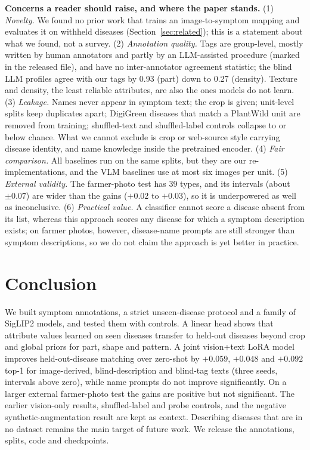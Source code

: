 \documentclass[11pt]{article}
\begin{document}
\textbf{Concerns a reader should raise, and where the paper stands.}
(1) \emph{Novelty.} We found no prior work that trains an image-to-symptom mapping and evaluates it on withheld diseases (Section~\ref{sec:related}); this is a statement about what we found, not a survey.
(2) \emph{Annotation quality.} Tags are group-level, mostly written by human annotators and partly by an LLM-assisted procedure (marked in the released file), and have no inter-annotator agreement statistic; the blind LLM profiles agree with our tags by 0.93 (part) down to 0.27 (density). Texture and density, the least reliable attributes, are also the ones models do not learn.
(3) \emph{Leakage.} Names never appear in symptom text; the crop is given; unit-level splits keep duplicates apart; DigiGreen diseases that match a PlantWild unit are removed from training; shuffled-text and shuffled-label controls collapse to or below chance. What we cannot exclude is crop or web-source style carrying disease identity, and name knowledge inside the pretrained encoder.
(4) \emph{Fair comparison.} All baselines run on the same splits, but they are our re-implementations, and the VLM baselines use at most six images per unit.
(5) \emph{External validity.} The farmer-photo test has 39 types, and its intervals (about $\pm0.07$) are wider than the gains ($+0.02$ to $+0.03$), so it is underpowered as well as inconclusive.
(6) \emph{Practical value.} A classifier cannot score a disease absent from its list, whereas this approach scores any disease for which a symptom description exists; on farmer photos, however, disease-name prompts are still stronger than symptom descriptions, so we do not claim the approach is yet better in practice.

\section{Conclusion}
We built symptom annotations, a strict unseen-disease protocol and a family of SigLIP2 models, and tested them with controls. A linear head shows that attribute values learned on seen diseases transfer to held-out diseases beyond crop and global priors for part, shape and pattern. A joint vision+text LoRA model improves held-out-disease matching over zero-shot by $+0.059$, $+0.048$ and $+0.092$ top-1 for image-derived, blind-description and blind-tag texts (three seeds, intervals above zero), while name prompts do not improve significantly. On a larger external farmer-photo test the gains are positive but not significant. The earlier vision-only results, shuffled-label and probe controls, and the negative synthetic-augmentation result are kept as context. Describing diseases that are in no dataset remains the main target of future work. We release the annotations, splits, code and checkpoints.
\end{document}
